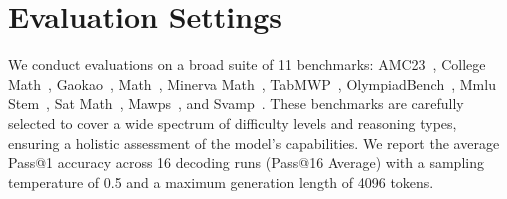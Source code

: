 
\section{Evaluation Settings}
\label{sec:eval_settings}
We conduct evaluations on a broad suite of 11 benchmarks: AMC23~\citep{amc2023dataset}, College Math~\citep{hendrycks2020measuring}, Gaokao~\citep{zhang2023evaluating}, Math~\citep{hendrycks2021measuring}, Minerva Math~\citep{lewkowycz2022solving}, TabMWP~\citep{lu2022dynamic}, OlympiadBench~\citep{he-etal-2024-olympiadbench}, Mmlu Stem~\citep{hendrycks2020measuring}, Sat Math~\citep{zhong2024agieval}, Mawps~\citep{koncel2016mawps}, and Svamp~\citep{patel2021nlp}. These benchmarks are carefully selected to cover a wide spectrum of difficulty levels and reasoning types, ensuring a holistic assessment of the model's capabilities. We report the average Pass@1 accuracy across 16 decoding runs (Pass@16 Average) with a sampling temperature of 0.5 and a maximum generation length of 4096 tokens.



